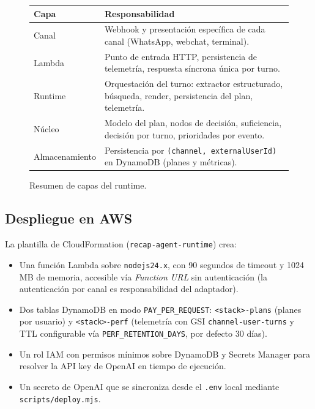 \documentclass[11pt,a4paper]{article}
\begin{document}
\begin{figure}[h!]
\centering
\begin{tabularx}{\linewidth}{|>{\raggedright\arraybackslash}p{3.2cm}|>{\raggedright\arraybackslash}X|}
\hline
\textbf{Capa} & \textbf{Responsabilidad} \\
\hline
Canal & Webhook y presentación específica de cada canal (WhatsApp, webchat, terminal). \\
\hline
Lambda & Punto de entrada HTTP, persistencia de telemetría, respuesta síncrona única por turno. \\
\hline
Runtime & Orquestación del turno: extractor estructurado, búsqueda, render, persistencia del plan, telemetría. \\
\hline
Núcleo & Modelo del plan, nodos de decisión, suficiencia, decisión por turno, prioridades por evento. \\
\hline
Almacenamiento & Persistencia por \texttt{(channel, externalUserId)} en DynamoDB (planes y métricas). \\
\hline
\end{tabularx}
\caption{Resumen de capas del runtime.}
\end{figure}

\subsection{Despliegue en AWS}

La plantilla de CloudFormation (\texttt{recap-agent-runtime}) crea:

\begin{itemize}[leftmargin=*,itemsep=2pt]
  \item Una función Lambda sobre \texttt{nodejs24.x}, con 90 segundos de
        timeout y 1024\,MB de memoria, accesible vía \emph{Function URL}
        sin autenticación (la autenticación por canal es responsabilidad
        del adaptador).
  \item Dos tablas DynamoDB en modo \texttt{PAY\_PER\_REQUEST}:
        \texttt{<stack>-plans} (planes por usuario) y
        \texttt{<stack>-perf} (telemetría con GSI \texttt{channel-user-turns}
        y TTL configurable vía \texttt{PERF\_RETENTION\_DAYS}, por defecto 30 días).
  \item Un rol IAM con permisos mínimos sobre DynamoDB y Secrets Manager
        para resolver la API key de OpenAI en tiempo de ejecución.
  \item Un secreto de OpenAI que se sincroniza desde el \texttt{.env} local
        mediante \texttt{scripts/deploy.mjs}.
\end{itemize}
\end{document}
